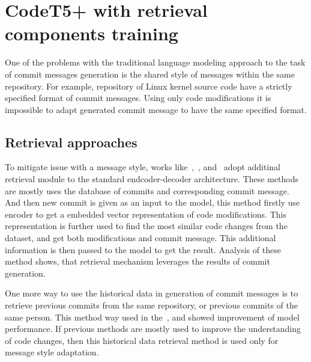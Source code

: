 \section{CodeT5+ with retrieval components training}\label{sec:codeT5_with_retrieval_train}
One of the problems with the traditional language modeling approach to the task of commit messages generation is the shared style of messages within the same repository. For example, repository of Linux kernel source code have a strictly specified format of commit messages. Using only code modifications it is impossible to adapt generated commit message to have the same specified format. 

\subsection{Retrieval approaches}\label{subsec:retrieval_existing_methods}
To mitigate issue with a message style, works like~\cite{shi2022race},~\cite{liu2020atom}, and~\cite{wang2021context} adopt additinal retrieval module to the standard endcoder-decoder architecture. These methods are mostly uses the database of commits and corresponding commit message. And then new commit is given as an input to the model, this method firstly use encoder to get a embedded vector representation of code modifications. This representation is further used to find the most similar code changes from the dataset, and get both modifications and commit message. This additional information is then passed to the model to get the result. Analysis of these method shows, that retrieval mechanism leverages the results of commit generation. 

One more way to use the historical data in generation of commit messages is to retrieve previous commits from the same repository, or previous commits of the same person. This method way used in the~\cite{eliseeva2023commit}, and showed improvement of model performance. If previous methods are mostly used to improve the understanding of code changes, then this historical data retrieval method is used only for message style adaptation.   

